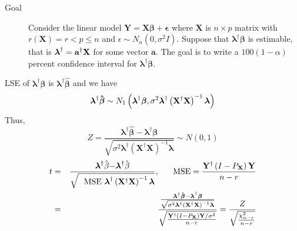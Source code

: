 \documentclass{article}
\begin{document}
\begin{description}
\item[Goal] Consider the linear model $\mathbf{Y=X\beta +\epsilon }$ where $%
\mathbf{X}$ is $n\times p$ matrix with $r\left( \mathbf{X}\right) =r<p\leq n$
and $\epsilon \sim N_{n}\left( 0,\sigma ^{2}I\right) $. Suppose that $%
\mathbf{\lambda }^{\dagger }\mathbf{\beta }$ is estimable, that is $\mathbf{%
\lambda }^{\dagger }=\mathbf{a}^{\dagger }\mathbf{X}$ for some vector $%
\mathbf{a}$. The goal is to write a $100\left( 1-\alpha \right) $ percent
confidence interval for $\mathbf{\lambda }^{\dagger }\mathbf{\beta }$.
\end{description}

\bigskip

LSE of $\mathbf{\lambda }^{\dagger }\mathbf{\beta }$ is $\mathbf{\lambda }%
^{\dagger }\mathbf{\hat{\beta}}$ and we have%
\begin{equation*}
\mathbf{\lambda }^{\dagger }\mathbf{\hat{\beta}}\sim N_{1}\left( \mathbf{%
\lambda }^{\dagger }\mathbf{\beta },\sigma ^{2}\mathbf{\lambda }^{\dagger
}\left( \mathbf{X}^{\dagger }\mathbf{X}\right) ^{-1}\mathbf{\lambda }\right) 
\end{equation*}%
Thus,%
\begin{equation*}
Z=\frac{\mathbf{\lambda }^{\dagger }\mathbf{\hat{\beta}}-\mathbf{\lambda }%
^{\dagger }\mathbf{\beta }}{\sqrt{\sigma ^{2}\mathbf{\lambda }^{\dagger
}\left( \mathbf{X}^{\dagger }\mathbf{X}\right) ^{-1}\mathbf{\lambda }}}\sim
N\left( 0,1\right) 
\end{equation*}%
\begin{eqnarray*}
t &=&\frac{\mathbf{\lambda }^{\dagger }\hat{\beta}\mathbf{-\lambda }%
^{\dagger }\hat{\beta}}{\sqrt{\text{MSE }\mathbf{\lambda }^{\dagger }\left( 
\mathbf{X}^{\dagger }\mathbf{X}\right) ^{-1}\mathbf{\lambda }}},\quad \text{%
MSE}=\frac{\mathbf{Y}^{\dagger }\left( I-P_{\mathbf{X}}\right) \mathbf{Y}}{%
n-r} \\
&=&\frac{\frac{\mathbf{\lambda }^{\dagger }\mathbf{\hat{\beta}-\lambda }%
^{\dagger }\mathbf{\beta }}{\sqrt{\sigma ^{2}\mathbf{\lambda }^{\dagger
}\left( \mathbf{X}^{\dagger }\mathbf{X}\right) ^{-1}\mathbf{\lambda }}}}{%
\sqrt{\frac{\mathbf{Y}^{\dagger }\left( I-P_{\mathbf{X}}\right) \mathbf{Y}%
/\sigma ^{2}}{n-r}}}=\frac{Z}{\sqrt{\frac{\chi _{n-r}^{2}}{n-r}}}
\end{eqnarray*}

\bigskip
\end{document}
